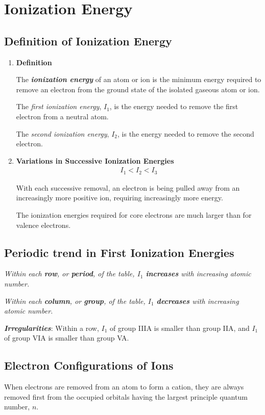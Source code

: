 \documentclass[12pt, a4paper]{report}
\newcommand{\impt}[1]{\textbf{\textit{#1}}}
\newcommand{\hi}{\section}
\newcommand{\hii}{\subsection}
\newcommand{\hiiBEGIN}[1]{\subsection{#1} \begin{enumerate}}
\newcommand{\hiiEND}{\end{enumerate}}
\newcommand{\hiii}{\item\textbf}
\begin{document}
\hi{Ionization Energy}
    \hiiBEGIN{Definition of Ionization Energy}
        \hiii{Definition}
        \par The \impt{ionization energy} of an atom or ion is the minimum energy required to remove
        an electron from the ground state of the isolated gaseous atom or ion.
        \par The \textit{first ionization energy}, $I_{1}$, is the energy needed to remove the first
        electron from a neutral atom.
        \begin{center}
        \end{center}
        \par The \textit{second ionization energy}, $I_{2}$, is the energy needed to remove the second
        electron.
        \begin{center}
        \end{center}
        \hiii{Variations in Successive Ionization Energies}
            \begin{align*}
                I_{1} < I_{2} < I_{3}
            \end{align*}
            \par With each successive removal, an electron is being pulled away from an increasingly
            more positive ion, requiring increasingly more energy.
            \par The ionization energies required for core electrons are much larger than for valence
            electrons.
    \hiiEND
    \hii{Periodic trend in First Ionization Energies}
        \par \textit{Within each \textbf{row}, or \textbf{period}, of the table, $I_{1}$
        \textbf{increases} with increasing atomic number.}
        \par \textit{Within each \textbf{column}, or \textbf{group}, of the table, $I_{1}$
        \textbf{decreases} with increasing atomic number.}
        \par \impt{Irregularities}: Within a row, $I_{1}$ of group IIIA is smaller than group IIA,
        and $I_{1}$ of group VIA is smaller than group VA.
    \hii{Electron Configurations of Ions}
        \par When electrons are removed from an atom to form a cation, they are always removed first
        from the occupied orbitals having the largest principle quantum number, $n$.
\end{document}
